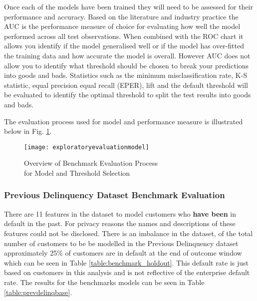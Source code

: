 Once each of the models have been trained they will need to be assessed for their performance and accuracy. Based on the literature and industry practice the AUC is the performance measure of choice for evaluating how well the model performed across all test observations. When combined with the ROC chart it allows you identify if the model generalised well or if the model has over-fitted the training data and how accurate the model is overall. However AUC does not allow you to identify what threshold should be chosen to break your predictions into goods and bads. Statistics such as the minimum misclassification rate, K-S statistic, equal precision equal recall (EPER), lift and the default threshold will be evaluated to identify the optimal threshold to split the test results into goods and bads. 

The evaluation process used for model and performance measure is illustrated below in Fig. \ref{fig:exploratoryevaluationmodel}. 

\begin{figure}[H]
	\texttt{[image: exploratoryevaluationmodel]}
	\caption{Overview of Benchmark Evaluation Process\\for Model and Threshold Selection}
	\label{fig:exploratoryevaluationmodel}
\end{figure}

\subsubsection{Previous Delinquency Dataset Benchmark Evaluation}

There are 11 features in the dataset to model customers who \textbf{have been} in default in the past. For privacy reasons the names and descriptions of these features could not be disclosed. There is an imbalance in the dataset, of the total number of customers to be be modelled in the Previous Delinquency dataset approximately 25\% of customers are in default at the end of outcome window which can be seen in Table \ref{table:benchmark_holdout}. This default rate is just based on customers in this analysis and is not reflective of the enterprise default rate. The results for the benchmarks models can be seen in Table \ref{table:prevdelinqbase}.

